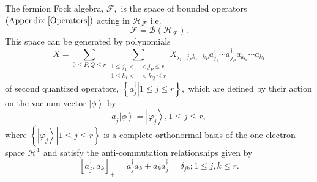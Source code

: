 \documentclass[aps,preprint,amsfonts,amssymb,showpacs,showkeys]{revtex4}%
\begin{document}
The fermion Fock algebra, $\mathcal{F},$ is the space of bounded operators
$\left(  \text{Appendix \ref{Operators}}\right)  $ acting in $\mathcal{H}%
_{\mathcal{F}}$ i.e.
\begin{equation}
\mathcal{F}=\mathcal{B}\left(  \mathcal{H}_{\mathcal{F}}\right)  .
\end{equation}
This space can be generated by polynomials
\begin{equation}
X=\sum_{0\leq P,Q\leq r}\sum_{\substack{1\leq j_{1}<\cdots<j_{P}\leq r\\1\leq
k_{1}<\cdots<k_{Q}\leq r}}X_{j_{1}\cdots j_{P}k_{1}\cdots k_{P}}a_{j_{1}%
}^{\dagger}\cdots a_{j_{P}}^{\dagger}a_{k_{Q}}\cdots a_{k_{1}}%
\end{equation}
of second quantized operators, $\left\{  \left.  a_{j}^{\dagger}\right\vert
1\leq j\leq r\right\}  ,$ which are defined by their action on the vacuum
vector $\left\vert \phi\right\rangle $ by
\begin{equation}
a_{j}^{\dagger}\left\vert \phi\right\rangle =\left\vert \varphi_{j}%
\right\rangle ,1\leq j\leq r,
\end{equation}
where $\left\{  \left.  \left\vert \varphi_{j}\right\rangle \right\vert 1\leq
j\leq r\right\}  $ is a complete orthonormal basis of the one-electron space
$\mathcal{H}^{1}$ and satisfy the anti-commutation relationships given by
\begin{equation}
\left[  a_{j}^{\dagger},a_{k}\right]  _{+}=a_{j}^{\dagger}a_{k}+a_{k}%
a_{j}^{\dagger}=\delta_{jk};1\leq j,k\leq r. \label{CAR}%
\end{equation}
\end{document}
